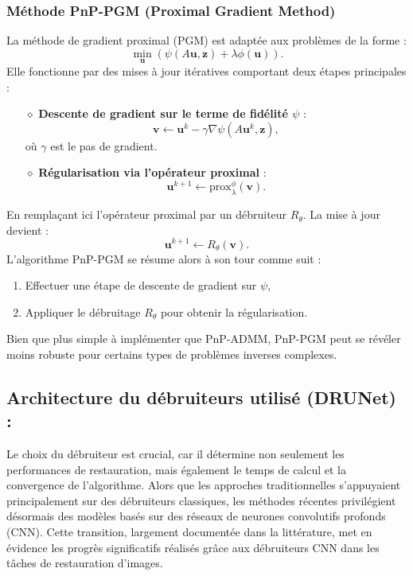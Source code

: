 \documentclass[a4paper, 12pt]{report} %
\begin{document}
\subsubsection{Méthode PnP-PGM (Proximal Gradient Method)}

La méthode de gradient proximal (PGM) est adaptée aux problèmes de la forme :
\[
\min_{\mathbf{u}} \left( \psi(A\mathbf{u}, \mathbf{z}) + \lambda \phi(\mathbf{u}) \right).
\]
Elle fonctionne par des mises à jour itératives comportant deux étapes principales :
\begin{itemize}
    \item [$\diamond$] \textbf{Descente de gradient sur le terme de fidélité \( \psi \)} :
    \[
    \mathbf{v} \leftarrow \mathbf{u}^k - \gamma \nabla \psi(A\mathbf{u}^k, \mathbf{z}),
    \]
    où  $\gamma$ est le pas de gradient.
    \item [$\diamond$] \textbf{Régularisation via l’opérateur proximal} :
    \[
    \mathbf{u}^{k+1} \leftarrow \text{prox}_{\lambda}^{\phi}(\mathbf{v}).
    \]
\end{itemize}
En remplaçant ici l'opérateur proximal par un débruiteur \( R_\theta \). La mise à jour devient :
\[
\mathbf{u}^{k+1} \leftarrow R_\theta(\mathbf{v}).
\]
L’algorithme PnP-PGM se résume alors à son tour comme suit :
\begin{enumerate}
    \item Effectuer une étape de descente de gradient sur \( \psi \),
    \item Appliquer le débruitage \( R_\theta \) pour obtenir la régularisation.
\end{enumerate}

Bien que plus simple à implémenter que PnP-ADMM, PnP-PGM peut se révéler moins robuste pour certains types de problèmes inverses complexes.

\subsection{Architecture du débruiteurs utilisé (DRUNet) :}

Le choix du débruiteur est crucial, car il détermine non seulement les performances de restauration, mais également le temps de calcul et la convergence de l'algorithme. Alors que les approches traditionnelles s’appuyaient principalement sur des débruiteurs classiques, les méthodes récentes privilégient désormais des modèles basés sur des réseaux de neurones convolutifs profonds (CNN). Cette transition, largement documentée dans la littérature, met en évidence les progrès significatifs réalisés grâce aux débruiteurs CNN dans les tâches de restauration d’images.
\end{document}
